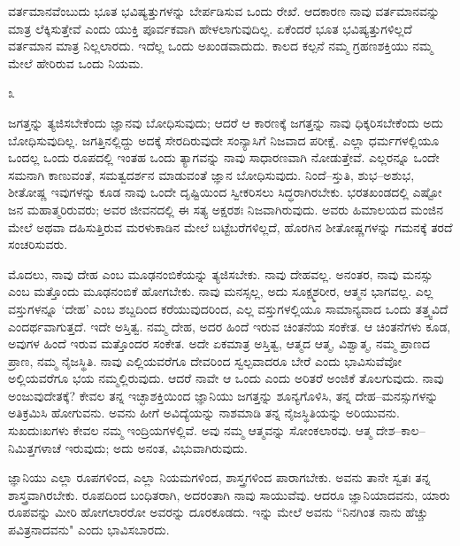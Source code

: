 ವರ್ತಮಾನವೆಂಬುದು ಭೂತ ಭವಿಷ್ಯತ್ತುಗಳನ್ನು ಬೇರ್ಪಡಿಸುವ ಒಂದು ರೇಖೆ. ಆದಕಾರಣ ನಾವು ವರ್ತಮಾನವನ್ನು ಮಾತ್ರ ಲೆಕ್ಕಿಸುತ್ತೇವೆ ಎಂದು ಯುಕ್ತಿ ಪೂರ್ವಕವಾಗಿ ಹೇಳಲಾಗುವುದಿಲ್ಲ. ಏಕೆಂದರೆ ಭೂತ ಭವಿಷ್ಯತ್ತುಗಳಿಲ್ಲದೆ ವರ್ತಮಾನ ಮಾತ್ರ ನಿಲ್ಲಲಾರದು. ಇದೆಲ್ಲ ಒಂದು ಅಖಂಡವಾದುದು. ಕಾಲದ ಕಲ್ಪನೆ ನಮ್ಮ ಗ್ರಹಣಶಕ್ತಿಯು ನಮ್ಮ ಮೇಲೆ ಹೇರಿರುವ ಒಂದು ನಿಯಮ.

\begin{center}
೩
\end{center}

ಜಗತ್ತನ್ನು ತ್ಯಜಿಸಬೇಕೆಂದು ಜ್ಞಾನವು ಬೋಧಿಸುವುದು; ಆದರೆ ಆ ಕಾರಣಕ್ಕೆ ಜಗತ್ತನ್ನು ನಾವು ಧಿಕ್ಕರಿಸಬೇಕೆಂದು ಅದು ಬೋಧಿಸುವುದಿಲ್ಲ. ಜಗತ್ತಿನಲ್ಲಿದ್ದು ಅದಕ್ಕೆ ಸೇರದಿರುವುದೇ ಸಂನ್ಯಾಸಿಗೆ ನಿಜವಾದ ಪರೀಕ್ಷೆ. ಎಲ್ಲಾ ಧರ್ಮಗಳಲ್ಲಿಯೂ ಒಂದಲ್ಲ ಒಂದು ರೂಪದಲ್ಲಿ ಇಂತಹ ಒಂದು ತ್ಯಾಗವನ್ನು ನಾವು ಸಾಧಾರಣವಾಗಿ ನೋಡುತ್ತೇವೆ. ಎಲ್ಲರನ್ನೂ ಒಂದೇ ಸಮನಾಗಿ ಕಾಣುವಂತೆ, ಸಮತ್ವದರ್ಶನ ಮಾಡುವಂತೆ ಜ್ಞಾನ ಬೋಧಿಸುವುದು. ನಿಂದೆ–ಸ್ತುತಿ, ಶುಭ–ಅಶುಭ, ಶೀತೋಷ್ಣ ಇವುಗಳನ್ನು ಕೂಡ ನಾವು ಒಂದೇ ದೃಷ್ಟಿಯಿಂದ ಸ್ವೀಕರಿಸಲು ಸಿದ್ಧರಾಗಿರಬೇಕು. ಭರತಖಂಡದಲ್ಲಿ ಎಷ್ಟೋ ಜನ ಮಹಾತ್ಮರಿರುವರು; ಅವರ ಜೀವನದಲ್ಲಿ ಈ ಸತ್ಯ ಅಕ್ಷರಶಃ ನಿಜವಾಗಿರುವುದು. ಅವರು ಹಿಮಾಲಯದ ಮಂಜಿನ ಮೇಲೆ ಅಥವಾ ದಹಿಸುತ್ತಿರುವ ಮರಳುಕಾಡಿನ ಮೇಲೆ ಬಟ್ಟೆಬರೆಗಳಿಲ್ಲದೆ, ಹೊರಗಿನ ಶೀತೋಷ್ಣಗಳನ್ನು ಗಮನಕ್ಕೆ ತರದೆ ಸಂಚರಿಸುವರು.

ಮೊದಲು, ನಾವು ದೇಹ ಎಂಬ ಮೂಢನಂಬಿಕೆಯನ್ನು ತ್ಯಜಿಸಬೇಕು. ನಾವು ದೇಹವಲ್ಲ. ಅನಂತರ, ನಾವು ಮನಸ್ಸು ಎಂಬ ಮತ್ತೊಂದು ಮೂಢನಂಬಿಕೆ ಹೋಗಬೇಕು. ನಾವು ಮನಸ್ಸಲ್ಲ, ಅದು ಸೂಕ್ಷ್ಮಶರೀರ, ಆತ್ಮನ ಭಾಗವಲ್ಲ. ಎಲ್ಲ ವಸ್ತುಗಳನ್ನೂ `ದೇಹ' ಎಂಬ ಶಬ್ದದಿಂದ ಕರೆಯುವುದರಿಂದ, ಎಲ್ಲ ವಸ್ತುಗಳಲ್ಲಿಯೂ ಸಾಮಾನ್ಯವಾದ ಒಂದು ತತ್ತ್ವವಿದೆ ಎಂದರ್ಥವಾಗುತ್ತದೆ. ಇದೇ ಅಸ್ತಿತ್ವ. ನಮ್ಮ ದೇಹ, ಅದರ ಹಿಂದೆ ಇರುವ ಚಿಂತನೆಯ ಸಂಕೇತ. ಆ ಚಿಂತನೆಗಳು ಕೂಡ, ಅವುಗಳ ಹಿಂದೆ ಇರುವ ಮತ್ತೊಂದರ ಸಂಕೇತ. ಅದೇ ಏಕಮಾತ್ರ ಅಸ್ತಿತ್ವ, ಆತ್ಮದ ಆತ್ಮ, ವಿಶ್ವಾತ್ಮ, ನಮ್ಮ ಪ್ರಾಣದ ಪ್ರಾಣ, ನಮ್ಮ ನೈಜಸ್ಥಿತಿ. ನಾವು ಎಲ್ಲಿಯವರೆಗೂ ದೇವರಿಂದ ಸ್ವಲ್ಪವಾದರೂ ಬೇರೆ ಎಂದು ಭಾವಿಸುವೆವೋ ಅಲ್ಲಿಯವರೆಗೂ ಭಯ ನಮ್ಮಲ್ಲಿರುವುದು. ಆದರೆ ನಾವೇ ಆ ಒಂದು ಎಂದು ಅರಿತರೆ ಅಂಜಿಕೆ ತೊಲಗುವುದು. ನಾವು ಅಂಜುವುದೇತಕ್ಕೆ? ಕೇವಲ ತನ್ನ ಇಚ್ಛಾಶಕ್ತಿಯಿಂದ ಜ್ಞಾನಿಯು ಜಗತ್ತನ್ನು ಶೂನ್ಯಗೊಳಿಸಿ, ತನ್ನ ದೇಹ–ಮನಸ್ಸುಗಳನ್ನು ಅತಿಕ್ರಮಿಸಿ ಹೋಗುವನು. ಅವನು ಹೀಗೆ ಅವಿದ್ಯೆಯನ್ನು ನಾಶಮಾಡಿ ತನ್ನ ನೈಜಸ್ಥಿತಿಯನ್ನು ಅರಿಯುವನು. ಸುಖದುಃಖಗಳು ಕೇವಲ ನಮ್ಮ ಇಂದ್ರಿಯಗಳಲ್ಲಿವೆ. ಅವು ನಮ್ಮ ಆತ್ಮವನ್ನು ಸೋಂಕಲಾರವು. ಆತ್ಮ ದೇಶ–ಕಾಲ–ನಿಮಿತ್ತಗಳಾಚೆ ಇರುವುದು; ಅದು ಅನಂತ, ವಿಭುವಾಗಿರುವುದು.

ಜ್ಞಾನಿಯು ಎಲ್ಲಾ ರೂಪಗಳಿಂದ, ಎಲ್ಲಾ ನಿಯಮಗಳಿಂದ, ಶಾಸ್ತ್ರಗಳಿಂದ ಪಾರಾಗಬೇಕು. ಅವನು ತಾನೇ ಸ್ವತಃ ತನ್ನ ಶಾಸ್ತ್ರವಾಗಿರಬೇಕು. ರೂಪದಿಂದ ಬಂಧಿತರಾಗಿ, ಅದರಂತಾಗಿ ನಾವು ಸಾಯುವೆವು. ಆದರೂ ಜ್ಞಾನಿಯಾದವನು, ಯಾರು ರೂಪವನ್ನು ಮೀರಿ ಹೋಗಲಾರರೋ ಅವರನ್ನು ದೂರಕೂಡದು. ಇನ್ನು ಮೇಲೆ ಅವನು “ನಿನಗಿಂತ ನಾನು ಹೆಚ್ಚು ಪವಿತ್ರನಾದವನು" ಎಂದು ಭಾವಿಸಬಾರದು.

